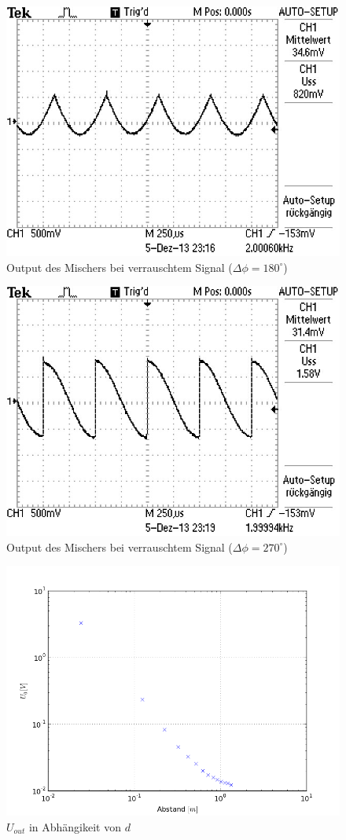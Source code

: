 \documentclass[11pt]{article}
\begin{document}
\begin{figure}[h]
\centering
\includegraphics[scale=0.85]{Bilder/5-noise-180.png}
\caption{Output des Mischers bei verrauschtem Signal ($\Delta\phi=180^\circ$) }
\label{Abb13}
\end{figure}

\begin{figure}[h]
\centering
\includegraphics[scale=0.85]{Bilder/5-noise-270.png}
\caption{Output des Mischers bei verrauschtem Signal ($\Delta\phi=270^\circ$)}
\label{Abb14}
\end{figure}

\begin{figure}[h]
\centering
\includegraphics[scale=0.50]{Diagramme/diag3.png}
\caption{$U_{out}$ in Abhängikeit von $d$}
\label{logplot}
\end{figure}
\end{document}
